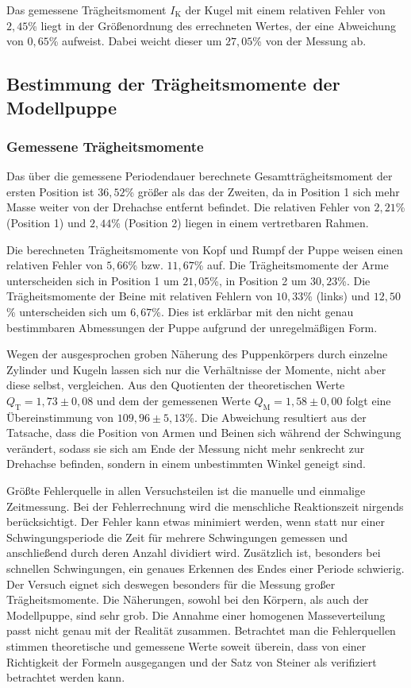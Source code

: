 Das gemessene Trägheitsmoment $I{_\text{K}}$ der Kugel mit einem relativen Fehler von ${2,45}$\% liegt in der Größenordnung des errechneten Wertes, der eine Abweichung von ${0,65}$\% aufweist. Dabei weicht dieser um ${27,05}$\% von der Messung ab.

\subsection{Bestimmung der Trägheitsmomente der Modellpuppe}
\subsubsection{Gemessene Trägheitsmomente}

Das über die gemessene Periodendauer berechnete Gesamtträgheitsmoment der ersten Position ist $36,52$\% größer als das der Zweiten, da in Position 1 sich mehr Masse weiter von der Drehachse entfernt befindet.
Die relativen Fehler von $2,21$\% (Position 1) und $2,44$\% (Position 2) liegen in einem vertretbaren Rahmen.

Die berechneten Trägheitsmomente von Kopf und Rumpf der Puppe weisen einen relativen Fehler von $5,66$\% bzw. $11,67$\% auf. 
Die Trägheitsmomente der Arme unterscheiden sich in Position 1 um $21,05$\%, in Position 2 um $30,23$\%. 
Die Trägheitsmomente der Beine mit relativen Fehlern von $10,33$\% (links) und $12,50$\% unterscheiden sich um $6,67$\%. 
Dies ist erklärbar mit den nicht genau bestimmbaren Abmessungen der Puppe aufgrund der unregelmäßigen Form.

Wegen der ausgesprochen groben Näherung des Puppenkörpers durch einzelne Zylinder und Kugeln lassen sich nur die Verhältnisse der Momente, nicht aber diese selbst, vergleichen.
 Aus den Quotienten der theoretischen Werte $Q_\text{T}=1,73 \pm 0,08$ und dem der gemessenen Werte $Q_\text{M}=1,58 \pm 0,00$ folgt eine  Übereinstimmung von $109,96 \pm 5,13$\%. 
Die Abweichung resultiert aus der Tatsache, dass die Position von Armen und Beinen sich während der Schwingung verändert, sodass sie sich am Ende der Messung nicht mehr senkrecht zur Drehachse befinden, sondern in einem unbestimmten Winkel geneigt sind.

Größte Fehlerquelle in allen Versuchsteilen ist die manuelle und einmalige Zeitmessung. Bei der Fehlerrechnung wird die menschliche Reaktionszeit nirgends berücksichtigt. Der Fehler kann etwas minimiert werden, wenn statt nur einer Schwingungsperiode die Zeit für mehrere Schwingungen gemessen und anschließend durch deren Anzahl dividiert wird.
Zusätzlich ist, besonders bei schnellen Schwingungen, ein genaues Erkennen des Endes einer Periode schwierig. Der Versuch eignet sich deswegen besonders für die Messung großer Trägheitsmomente. Die Näherungen, sowohl bei den Körpern, als auch der Modellpuppe, sind sehr grob. Die Annahme einer homogenen Masseverteilung passt nicht genau mit der Realität zusammen.
Betrachtet man die Fehlerquellen stimmen theoretische und gemessene Werte soweit überein, dass von einer Richtigkeit der Formeln ausgegangen und der Satz von Steiner als verifiziert betrachtet werden kann.


